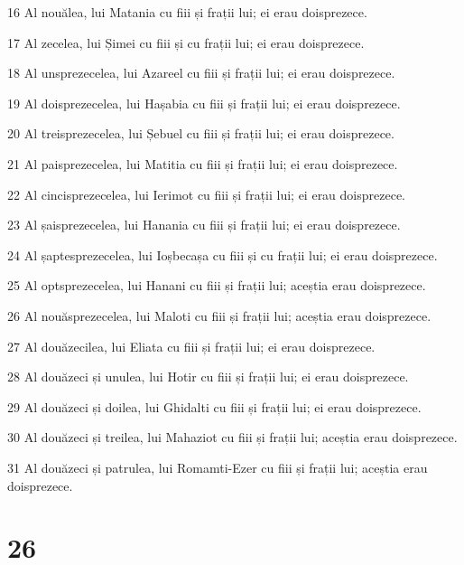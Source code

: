\par 16 Al nouălea, lui Matania cu fiii și frații lui; ei erau doisprezece.
\par 17 Al zecelea, lui Șimei cu fiii și cu frații lui; ei erau doisprezece.
\par 18 Al unsprezecelea, lui Azareel cu fiii și frații lui; ei erau doisprezece.
\par 19 Al doisprezecelea, lui Hașabia cu fiii și frații lui; ei erau doisprezece.
\par 20 Al treisprezecelea, lui Șebuel cu fiii și frații lui; ei erau doisprezece.
\par 21 Al paisprezecelea, lui Matitia cu fiii și frații lui; ei erau doisprezece.
\par 22 Al cincisprezecelea, lui Ierimot cu fiii și frații lui; ei erau doisprezece.
\par 23 Al șaisprezecelea, lui Hanania cu fiii și frații lui; ei erau doisprezece.
\par 24 Al șaptesprezecelea, lui Ioșbecașa cu fiii și cu frații lui; ei erau doisprezece.
\par 25 Al optsprezecelea, lui Hanani cu fiii și frații lui; aceștia erau doisprezece.
\par 26 Al nouăsprezecelea, lui Maloti cu fiii și frații lui; aceștia erau doisprezece.
\par 27 Al douăzecilea, lui Eliata cu fiii și frații lui; ei erau doisprezece.
\par 28 Al douăzeci și unulea, lui Hotir cu fiii și frații lui; ei erau doisprezece.
\par 29 Al douăzeci și doilea, lui Ghidalti cu fiii și frații lui; ei erau doisprezece.
\par 30 Al douăzeci și treilea, lui Mahaziot cu fiii și frații lui; aceștia erau doisprezece.
\par 31 Al douăzeci și patrulea, lui Romamti-Ezer cu fiii și frații lui; aceștia erau doisprezece.

\chapter{26}

